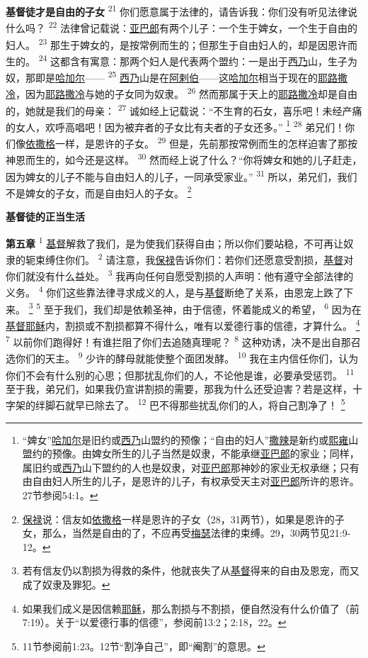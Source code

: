\textbf{基督徒才是自由的子女\quad}
\textsuperscript{21}
你们愿意属于法律的，请告诉我：你们没有听见法律说什么吗？
\textsuperscript{22}
法律曾记载说：\uline{亚巴郎}有两个儿子：一个生于婢女，一个生于自由的妇人。
\textsuperscript{23}
那生于婢女的，是按常例而生的；但那生于自由妇人的，却是因恩许而生的。
\textsuperscript{24}
这都含有寓意：那两个妇人是代表两个盟约：一是出于\uline{西乃}山，生子为奴，那即是\uline{哈加尔}——
\textsuperscript{25}
\uline{西乃}山是在\uline{阿剌伯}——这\uline{哈加尔}相当于现在的\uline{耶路撒冷}，因为\uline{耶路撒冷}与她的子女同为奴隶。
\textsuperscript{26}
然而那属于天上的\uline{耶路撒冷}却是自由的，她就是我们的母亲：
\textsuperscript{27}
诚如经上记载说：“不生育的石女，喜乐吧！未经产痛的女人，欢呼高唱吧！因为被弃者的子女比有夫者的子女还多。”
\footnote{“婢女”\uline{哈加尔}是旧约或\uline{西乃}山盟约的预像；“自由的妇人”\uline{撒辣}是新约或\uline{熙雍}山盟约的预像。由婢女所生的儿子当然是奴隶，不能承继\uline{亚巴郎}的家业；同样，属旧约或\uline{西乃}山下盟约的人也是奴隶，对\uline{亚巴郎}那神妙的家业无权承继；只有由自由妇人所生的儿子，是恩许的儿子，有权承受天主对\uline{亚巴郎}所许的恩许。27节参阅54:1。}
\textsuperscript{28}
弟兄们！你们像\uline{依撒格}一样，是恩许的子女。
\textsuperscript{29}
但是，先前那按常例而生的怎样迫害了那按神恩而生的，如今还是这样。
\textsuperscript{30}
然而经上说了什么？“你将婢女和她的儿子赶走，因为婢女的儿子不能与自由妇人的儿子，一同承受家业。”
\textsuperscript{31}
所以，弟兄们，我们不是婢女的子女，而是自由妇人的子女。
\footnote{\uline{保禄}说：信友如\uline{依撒格}一样是恩许的子女（28，31两节），如果是恩许的子女，那么，当然是自由的了，不应再受\uline{梅瑟}法律的束缚。29，30两节见21:9-12。}

\begin{center}
	\textbf{\large{\songti 基督徒的正当生活}}
\end{center}

\textbf{第五章\quad}
\textsuperscript{1}
\uline{基督}解救了我们，是为使我们获得自由；所以你们要站稳，不可再让奴隶的轭束缚住你们。
\textsuperscript{2}
请注意，我\uline{保禄}告诉你们：若你们还愿意受割损，\uline{基督}对你们就没有什么益处。
\textsuperscript{3}
我再向任何自愿受割损的人声明：他有遵守全部法律的义务。
\textsuperscript{4}
你们这些靠法律寻求成义的人，是与\uline{基督}断绝了关系，由恩宠上跌了下来。
\footnote{若有信友仍以割损为得救的条件，他就丧失了从\uline{基督}得来的自由及恩宠，而又成了奴隶及罪犯。}
\textsuperscript{5}
至于我们，我们却是依赖圣神，由于信德，怀着能成义的希望，
\textsuperscript{6}
因为在\uline{基督}\uline{耶稣}内，割损或不割损都算不得什么，唯有以爱德行事的信德，才算什么。
\footnote{如果我们成义是因信赖\uline{耶稣}，那么割损与不割损，便自然没有什么价值了（前7:19）。关于“以爱德行事的信德”，参阅前13:2；2:18，22。}
\textsuperscript{7}
以前你们跑得好！有谁拦阻了你们去追随真理呢？
\textsuperscript{8}
这种劝诱，决不是出自那召选你们的天主。
\textsuperscript{9}
少许的酵母就能使整个面团发酵。
\textsuperscript{10}
我在主内信任你们，认为你们不会有什么别的心思；但那扰乱你们的人，不论他是谁，必要承受惩罚。
\textsuperscript{11}
至于我，弟兄们，如果我仍宣讲割损的需要，那我为什么还受迫害？若是这样，十字架的绊脚石就早已除去了。
\textsuperscript{12}
巴不得那些扰乱你们的人，将自己割净了！
\footnote{11节参阅前1:23。12节“割净自己”，即“阉割”的意思。}

